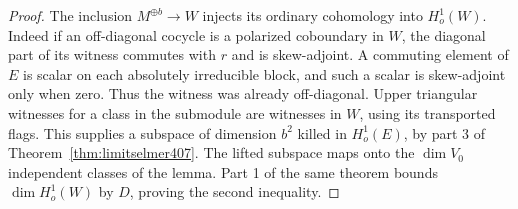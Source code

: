 \documentclass[a4paper,11pt]{article}
\theoremstyle{definition}
\theoremstyle{remark}
\numberwithin{equation}{section}
\begin{document}
\begin{proof}
The inclusion \(M^{\oplus b}\to W\) injects its ordinary
cohomology into \(H^1_o(W)\). Indeed if an off-diagonal
cocycle is a polarized coboundary in \(W\), the diagonal
part of its witness commutes with \(r\) and is skew-adjoint.
A commuting element of \(E\) is scalar on each absolutely
irreducible block, and such a scalar is skew-adjoint only
when zero. Thus the witness was already off-diagonal.
Upper triangular witnesses for a class in the submodule
are witnesses in \(W\), using its transported flags.
This supplies a subspace of dimension \(b^2\) killed in
\(H^1_o(E)\), by part 3 of Theorem~\ref{thm:limitselmer407}.
The lifted subspace maps onto the \(\dim V_0\) independent
classes of the lemma. Part 1 of the same theorem bounds
\(\dim H^1_o(W)\) by \(D\), proving the second inequality.
\end{proof}
\end{document}
